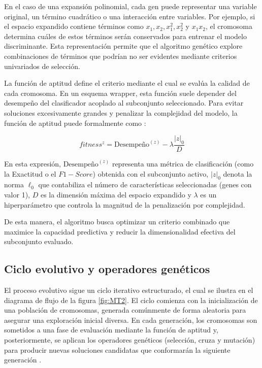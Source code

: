 En el caso de una expansión polinomial, cada gen puede representar una variable original, un término cuadrático o una interacción entre variables. Por ejemplo, si el espacio expandido contiene términos como $x_1,x_2,x_1^2,x_2^2$ y $x_1x_2$, el cromosoma determina cuáles de estos términos serán conservados para entrenar el modelo discriminante. Esta representación permite que el algoritmo genético explore combinaciones de términos que podrían no ser evidentes mediante criterios univariados de selección.

La función de aptitud define el criterio mediante el cual se evalúa la calidad de cada cromosoma. En un esquema wrapper, esta función suele depender del desempeño del clasificador acoplado al subconjunto seleccionado. Para evitar soluciones excesivamente grandes y penalizar la complejidad del modelo, la función de aptitud puede formalmente como \cite{siedlecki1989note}:

\begin{equation}
	fitness^{z} = \text{Desempeño}^{(z)}-\lambda \frac{|z|_0}{D}
	\label{eq:EMT14}
\end{equation}

En esta expresión, $\text{Desempeño}^{(z)}$ representa una métrica de clasificación (como la Exactitud o el $F1-Score$) obtenida con el subconjunto activo, $|z|_0$ denota la norma $\ell_0$ que contabiliza el número de características seleccionadas (genes con valor 1), $D$ es la dimensión máxima del espacio expandido y $\lambda$ es un hiperparámetro que controla la magnitud de la penalización por complejidad. 

De esta manera, el algoritmo busca optimizar un criterio combinado que maximice la capacidad predictiva y reducir la dimensionalidad efectiva del subconjunto evaluado.

\subsection{Ciclo evolutivo y operadores genéticos}

El proceso evolutivo sigue un ciclo iterativo estructurado, el cual se ilustra en el diagrama de flujo de la figura \ref{fig:MT2}. El ciclo comienza con la inicialización de una población de cromosomas, generada comúnmente de forma aleatoria para asegurar una exploración inicial diversa. En cada generación, los cromosomas son sometidos a una fase de evaluación mediante la función de aptitud y, posteriormente, se aplican los operadores genéticos (selección, cruza y mutación) para producir nuevas soluciones candidatas que conformarán la siguiente generación \cite{Goldberg1988}.

